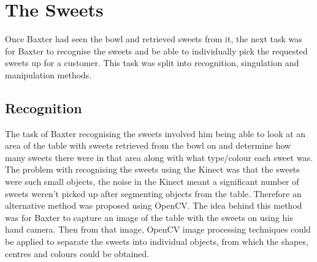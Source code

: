 \section{The Sweets}
Once Baxter had seen the bowl and retrieved sweets from it, the next task was for Baxter to recognise the sweets and be able to individually pick the requested sweets up for a customer. This task was split into recognition, singulation and manipulation methods.
\subsection{Recognition}
The task of Baxter recognising the sweets involved him being able to look at an area of the table with sweets retrieved from the bowl on and determine how many sweets there were in that area along with what type/colour each sweet was. The problem with recognising the sweets using the Kinect was that the sweets were such small objects,  the noise in the Kinect meant a significant number of sweets weren't picked up after segmenting objects from the table. Therefore an alternative method was proposed using OpenCV. The idea behind this method was for Baxter to capture an image of the table with the sweets on using his hand camera. Then from that image, OpenCV image processing techniques could be applied to separate the sweets into individual objects, from which the shapes, centres and colours could be obtained.
